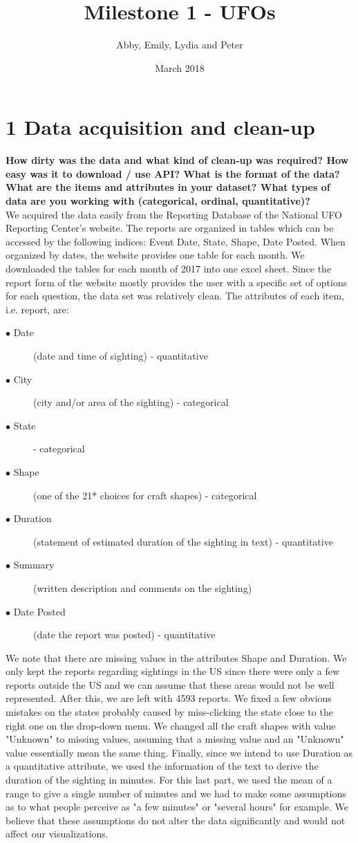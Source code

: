\documentclass{neu_handout}
\title{Milestone 1 - UFOs}
\author{Abby, Emily, Lydia and Peter}
\date{March 2018}
\begin{document}
\section*{1 Data acquisition and clean-up}

\textbf{How dirty was the data and what kind of clean-up was required? How
easy was it to download / use API? What is the format of the data? What are the
items and attributes in your dataset? What types of data are you working with
(categorical, ordinal, quantitative)?}\\

We acquired the data easily from the Reporting Database of the National UFO Reporting Center's website. The reports are organized in tables which can be accessed by the following indices: Event Date, State, Shape, Date Posted. When organized by dates, the website provides one table for each month. We downloaded the tables for each month of 2017 into one excel sheet. Since the report form of the website mostly provides the user with a specific set of options for each question, the data set was relatively clean. The attributes of each item, i.e. report, are:

\begin{description}
  \item[$\bullet$ Date] (date and time of sighting) - quantitative
  \item[$\bullet$ City] (city and/or area of the sighting) - categorical
  \item[$\bullet$ State] - categorical
  \item[$\bullet$ Shape] (one of the 21* choices for craft shapes) - categorical
  \item[$\bullet$ Duration] (statement of estimated duration of the sighting in text) - quantitative
  \item[$\bullet$ Summary] (written description and comments on the sighting)
  \item[$\bullet$ Date Posted] (date the report was posted) - quantitative
\end{description}

We note that there are missing values in the attributes Shape and Duration. We only kept the reports regarding sightings in the US since there were only a few reports outside the US and we can assume that these areas would not be well represented. After this, we are left with 4593 reports. We fixed a few obvious mistakes on the states probably caused by miss-clicking the state close to the right one on the drop-down menu. We changed all the craft shapes with value "Unknown" to missing values, assuming that a missing value and an "Unknown" value essentially mean the same thing. Finally, since we intend to use Duration as a quantitative attribute, we used the information of the text to derive the duration of the sighting in minutes. For this last part, we used the mean of a range to give a single number of minutes and we had to make some assumptions as to what people perceive as "a few minutes" or "several hours" for example. We believe that these assumptions do not alter the data significantly and would not affect our visualizations.
\end{document}
